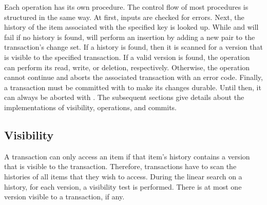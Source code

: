 %

Each operation has its own procedure. The control flow of most procedures is structured in the same way. At first, inputs are checked for errors. Next, the history of the item associated with the specified key is looked up. While  and  will fail if no history is found,  will perform an insertion by adding a new pair to the transaction's change set. If a history is found, then it is scanned for a version that is visible to the specified transaction. If a valid version is found, the operation can perform its read, write, or deletion, respectively. Otherwise, the operation cannot continue and aborts the associated transaction with an error code. Finally, a transaction must be committed with  to make its changes durable. Until then, it can always be aborted with . The subsequent sections give details about the implementations of visibility, operations, and commits.

\subsection{Visibility}
\label{ch:impl-vsb}

A transaction can only access an item if that item's history contains a version that is visible to the transaction. Therefore, transactions have to scan the histories of all items that they wish to access. During the linear search on a history, for each version, a visibility test is performed. There is at most one version visible to a transaction, if any.


